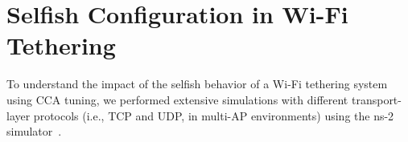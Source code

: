 \section{Selfish Configuration in Wi-Fi Tethering}
\label{sec:channel-selection}


To understand the impact of the selfish behavior of a Wi-Fi
tethering system using CCA tuning, we performed extensive simulations
with different transport-layer protocols (i.e., TCP and UDP,
in multi-AP environments) using the ns-2 simulator~\cite{NS2}.

